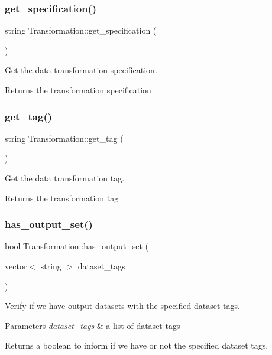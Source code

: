 \subsubsection{\texorpdfstring{get\+\_\+specification()}{get\_specification()}}
{\footnotesize\ttfamily string Transformation\+::get\+\_\+specification (\begin{DoxyParamCaption}{ }\end{DoxyParamCaption})}

Get the data transformation specification. \begin{DoxyReturn}{Returns}
the transformation specification 
\end{DoxyReturn}
\mbox{\label{classTransformation_a5ad25a244c9506d5bb89cfed8a3667b0}} 
\subsubsection{\texorpdfstring{get\+\_\+tag()}{get\_tag()}}
{\footnotesize\ttfamily string Transformation\+::get\+\_\+tag (\begin{DoxyParamCaption}{ }\end{DoxyParamCaption})}

Get the data transformation tag. \begin{DoxyReturn}{Returns}
the transformation tag 
\end{DoxyReturn}
\mbox{\label{classTransformation_a86424a75814c92796a3dbd5530df7598}} 
\subsubsection{\texorpdfstring{has\+\_\+output\+\_\+set()}{has\_output\_set()}}
{\footnotesize\ttfamily bool Transformation\+::has\+\_\+output\+\_\+set (\begin{DoxyParamCaption}\item[{vector$<$ string $>$}]{dataset\+\_\+tags }\end{DoxyParamCaption})}

Verify if we have output datasets with the specified dataset tags. 
\begin{DoxyParams}{Parameters}
{\em dataset\+\_\+tags} & a list of dataset tags \\
\hline
\end{DoxyParams}
\begin{DoxyReturn}{Returns}
a boolean to inform if we have or not the specified dataset tags. 
\end{DoxyReturn}
\mbox{\label{classTransformation_a015a16690d152a99ddf482cb56c05e07}} 
